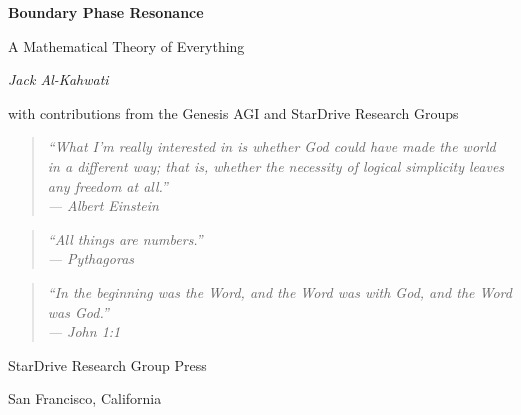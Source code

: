 \documentclass[12pt,oneside]{book}
\theoremstyle{definition}
\begin{document}
\frontmatter

\begin{titlepage}
  \centering\vspace*{1.2cm}
  {\Huge\bfseries Boundary Phase Resonance\par}\vspace{0.5cm}
  {\LARGE A Mathematical Theory of Everything\par}\vspace{1.6cm}
  {\large\itshape Jack Al-Kahwati\par}\vspace{0.3cm}
  {\small with contributions from the Genesis AGI and StarDrive Research Groups\par}
  \vspace{2.4cm}
  \begin{quote}\centering\itshape
    ``What I'm really interested in is whether God could have made the world in a
    different way; that is, whether the necessity of logical simplicity leaves any
    freedom at all.''\\\upshape\small --- Albert Einstein
  \end{quote}\vspace{1cm}
  \begin{quote}\centering\itshape
    ``All things are numbers.''\\\upshape\small --- Pythagoras
  \end{quote}\vspace{0.8cm}
  \begin{quote}\centering\itshape
    ``In the beginning was the Word, and the Word was with God, and the Word was
    God.''\\\upshape\small --- John 1:1
  \end{quote}
  \vfill
  {\large StarDrive Research Group Press\par}
  {\normalsize San Francisco, California\par}\vspace{0.6cm}
\end{titlepage}
\end{document}
